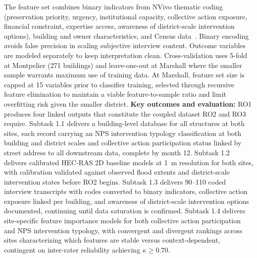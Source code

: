 \documentclass[11pt]{article}
\begin{document}
The feature set combines binary indicators from NVivo thematic
coding~\cite{boyatzis1998transforming} (preservation priority, urgency, institutional
capacity, collective action exposure, financial constraint, expertise access, awareness
of district-scale intervention options), building and owner characteristics, and
Census data~\cite{uscensus_acs5year}.
Binary encoding avoids false precision in scaling subjective interview content.
Outcome variables are modeled separately to keep interpretation clean.
Cross-validation uses 5-fold at Montpelier (271 buildings) and leave-one-out
at Marshall where the smaller sample warrants maximum use of training data.
At Marshall, feature set size is capped at 15 variables prior to classifier
training, selected through recursive feature elimination to maintain a viable
feature-to-sample ratio and limit overfitting risk given the smaller district.
\textbf{Key outcomes and evaluation:}
RO1 produces four linked outputs that constitute the coupled dataset RO2 and RO3 require.
Subtask 1.1 delivers a building-level database for all structures at both sites,
each record carrying an NPS intervention typology classification at both building
and district scales and collective action participation status linked by street
address to all downstream data, complete by month 12.
Subtask 1.2 delivers calibrated HEC-RAS 2D baseline models at 1~m resolution for
both sites, with calibration validated against observed flood extents and
district-scale intervention states before RO2 begins.
Subtask 1.3 delivers 90--110 coded interview transcripts with codes converted to
binary indicators, collective action exposure linked per building, and awareness
of district-scale intervention options documented, continuing until data saturation
is confirmed.
Subtask 1.4 delivers site-specific feature importance models for both collective
action participation and NPS intervention typology, with convergent and divergent
rankings across sites characterizing which features are stable versus
context-dependent, contingent on inter-rater reliability achieving $\kappa \geq 0.70$.
\end{document}
